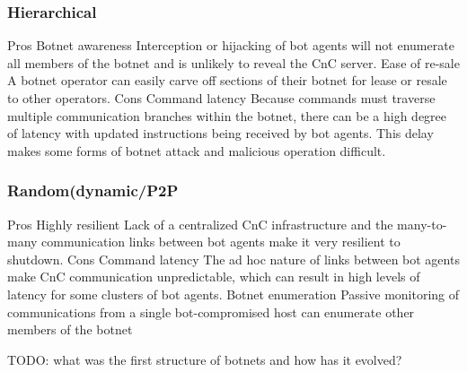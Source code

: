 \subsubsection{Hierarchical}
    Pros 
  Botnet awareness
Interception or hijacking of bot agents
will not enumerate all members of the
botnet and is unlikely to reveal the CnC
server.
  Ease of re-sale
A botnet operator can easily carve off
sections of their botnet for lease or resale
to other operators.
    Cons
  Command latency
Because commands must traverse
multiple communication branches within
the botnet, there can be a high degree of
latency with updated instructions being
received by bot agents. This delay makes
some forms of botnet attack and
malicious operation difficult.

\subsubsection{Random(dynamic/P2P}
    Pros 
  Highly resilient
Lack of a centralized CnC infrastructure
and the many-to-many communication
links between bot agents make it very
resilient to shutdown.
    Cons
  Command latency
The ad hoc nature of links between bot
agents make CnC communication
unpredictable, which can result in high
levels of latency for some clusters of bot
agents.
  Botnet enumeration
Passive monitoring of communications
from a single bot-compromised host can
enumerate other members of the botnet


TODO: what was the first structure of botnets and how has it evolved?

